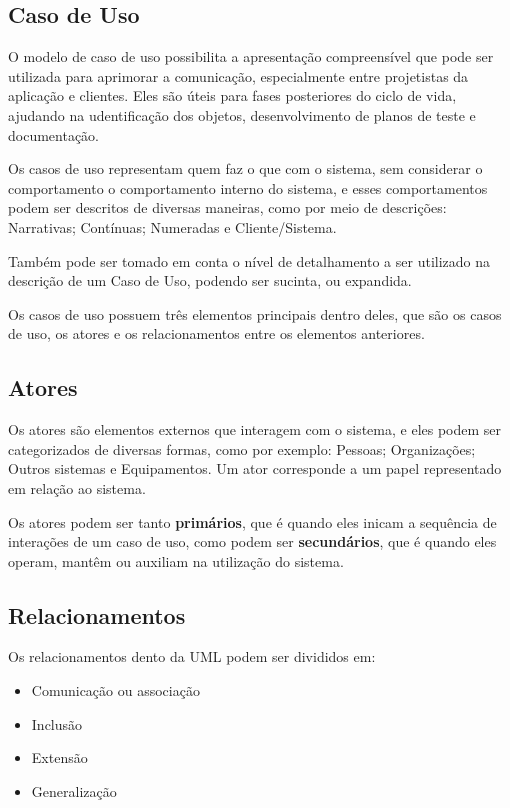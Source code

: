 \documentclass[12pt a4paper]{paper}
\begin{document}
\subsection{Caso de Uso} %
\label{sub:Caso de Uso}
O modelo de caso de uso possibilita a apresentação compreensível que pode ser utilizada 
para aprimorar a comunicação, especialmente entre projetistas da aplicação e clientes. 
Eles são úteis para fases posteriores do ciclo de vida, ajudando na udentificação dos objetos, desenvolvimento de planos de teste e documentação.

Os casos de uso representam quem faz o que com o sistema, sem considerar o comportamento
o comportamento interno do sistema, e esses comportamentos podem ser descritos de 
diversas maneiras, como por meio de descrições: Narrativas; Contínuas; Numeradas e 
Cliente/Sistema. 

Também pode ser tomado em conta o nível de detalhamento a ser utilizado na descrição 
de um Caso de Uso, podendo ser sucinta, ou expandida. 

Os casos de uso possuem três elementos principais dentro deles, que são os casos de uso, 
os atores e os relacionamentos entre os elementos anteriores.

\subsection{Atores} %
\label{sub:Atores}
Os atores são elementos externos que interagem com o sistema, e eles podem ser 
categorizados de diversas formas, como por exemplo: Pessoas; Organizações; Outros 
sistemas e Equipamentos. Um ator corresponde a um papel representado em relação ao 
sistema.

Os atores podem ser tanto \textbf{primários}, que é quando eles inicam a sequência de 
interações de um caso de uso, como podem ser \textbf{secundários}, que é quando eles 
operam, mantêm ou auxiliam na utilização do sistema.

\subsection{Relacionamentos} %
\label{sub:Relacionamentos}
Os relacionamentos dento da UML podem ser divididos em: 

\begin{itemize}
  \item Comunicação ou associação 
  \item Inclusão 
  \item Extensão 
  \item Generalização
\end{itemize}
\end{document}
